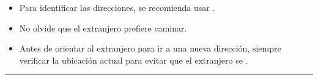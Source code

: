 \documentclass[letterpaper,10pt,spanish]{sphinxmanual}
\begin{document}
\begin{enumerate}
\begin{itemize}
\item {} 
\sphinxAtStartPar
Para identificar las direcciones, se recomienda usar .

\item {} 
\sphinxAtStartPar
No olvide que el extranjero prefiere caminar.

\item {} 
\sphinxAtStartPar
Antes de orientar al extranjero para ir a una nueva dirección, siempre verificar la ubicación actual para evitar que el extranjero se .

\end{itemize}

\end{enumerate}


\bigskip\hrule\bigskip
\end{document}
